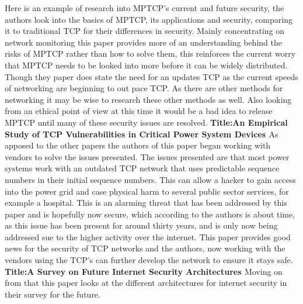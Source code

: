 \documentclass{scrartcl}
\begin{document}
	\newline
Here is an example of research into MPTCP's current and future security, the authors look into the basics of MPTCP, its applications and security, comparing it to traditional TCP for their differences in security. Mainly concentrating on network monitoring this paper provides more of an understanding behind the risks of MPTCP rather than how to solve them, this reinforces the current worry that MPTCP needs to be looked into more before it can be widely distributed. Though they paper does state the need for an updates TCP as the current speeds of networking are beginning to out pace TCP. As there are other methods for networking it may be wise to research these other methods as well. Also looking from an ethical point of view at this time it would be a bad idea to release MPTCP until many of these security issues are resolved.
	\newline
	\newline
	\newline
	\textbf{Title:An Empirical Study of TCP Vulnerabilities in Critical Power System Devices \cite{Vulnerablilities}}
	\newline
As apposed to the other papers the authors of this paper began working with vendors to solve the issues presented. The issues presented are that most power systems work with an outdated TCP network that uses predictable sequence numbers in their initial sequence numbers. This can allow a hacker to gain access into the power grid and case physical harm to several public sector services, for example a hospital. This is an alarming threat that has been addressed by this paper and is hopefully now secure, which according to the authors is about time, as this issue has been present for around thirty years, and is only now being addressed sue to the higher activity over the internet. This paper provides good news for the security of TCP networks and the authors, now working with the vendors using the TCP's can further develop the network to ensure it stays safe.
	\newline
	\newline
	\newline
	\textbf{Title:A Survey on Future Internet Security Architectures \cite{Future}}
	\newline
Moving on from that this paper looks at the different architectures for internet security in their survey for the future. 
	
	
	
	
	
\end{document}
